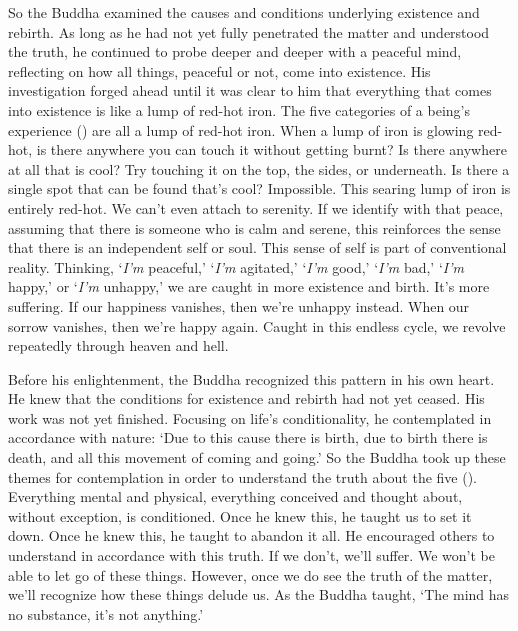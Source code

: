 So the Buddha examined the causes and conditions underlying existence and rebirth. As long as he had not yet fully penetrated the matter and understood the truth, he continued to probe deeper and deeper with a peaceful mind, reflecting on how all things, peaceful or not, come into existence. His investigation forged ahead until it was clear to him that everything that comes into existence is like a lump of red-hot iron. The five categories of a being's experience () are all a lump of red-hot iron. When a lump of iron is glowing red-hot, is there anywhere you can touch it without getting burnt? Is there anywhere at all that is cool? Try touching it on the top, the sides, or underneath. Is there a single spot that can be found that's cool? Impossible. This searing lump of iron is entirely red-hot. We can't even attach to serenity. If we identify with that peace, assuming that there is someone who is calm and serene, this reinforces the sense that there is an independent self or soul. This sense of self is part of conventional reality. Thinking, `\textit{I'm} peaceful,' `\textit{I'm} agitated,' `\textit{I'm} good,' `\textit{I'm} bad,' `\textit{I'm} happy,' or `\textit{I'm} unhappy,' we are caught in more existence and birth. It's more suffering. If our happiness vanishes, then we're unhappy instead. When our sorrow vanishes, then we're happy again. Caught in this endless cycle, we revolve repeatedly through heaven and hell.

Before his enlightenment, the Buddha recognized this pattern in his own heart. He knew that the conditions for existence and rebirth had not yet ceased. His work was not yet finished. Focusing on life's conditionality, he contemplated in accordance with nature: `Due to this cause there is birth, due to birth there is death, and all this movement of coming and going.' So the Buddha took up these themes for contemplation in order to understand the truth about the five (). Everything mental and physical, everything conceived and thought about, without exception, is conditioned. Once he knew this, he taught us to set it down. Once he knew this, he taught to abandon it all. He encouraged others to understand in accordance with this truth. If we don't, we'll suffer. We won't be able to let go of these things. However, once we do see the truth of the matter, we'll recognize how these things delude us. As the Buddha taught, `The mind has no substance, it's not anything.'

